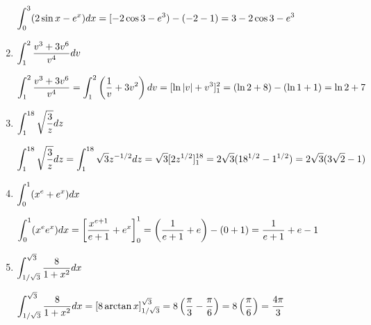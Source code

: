 \begin{enumerate}[1.]
\begin{Solution}
  $\displaystyle \int_0^3 (2 \sin x - e^x) dx = 
    [-2 \cos 3 - e^3) - (-2 - 1) =
    3 - 2 \cos 3 - e^3$
    
\end{Solution}

\item \begin{Question}
    
  $\displaystyle \int_1^2 \frac{v^3 + 3v^6}{v^4} dv$
\end{Question}

\begin{Solution}
  $\displaystyle \int_1^2 \frac{v^3 + 3v^6}{v^4} =
    \int_1^2 \left( \frac{1}{v} + 3v^2 \right) dv =
    [ \ln |v| + v^3]_1^2 = 
    ( \ln 2 + 8 ) - ( \ln 1 + 1) =
    \ln 2 + 7$
\end{Solution}

\item \begin{Question}
    
  $\displaystyle \int_1^{18} \sqrt{\frac{3}{z}} dz$
\end{Question}

\begin{Solution}
  $\displaystyle \int_1^{18} \sqrt{\frac{3}{z}} dz =
    \int_1^{18} \sqrt{3} z^{-1/2} dz =
    \sqrt{3} [ 2z^{1/2} ]_1^{18} =
    2 \sqrt{3} (18^{1/2} - 1^{1/2}) = 
    2 \sqrt{3} (3 \sqrt{2} - 1)$
\end{Solution}

\item \begin{Question}
    
  $\displaystyle \int_0^1 (x^e + e^x) dx$
\end{Question}

\begin{Solution}
    
  $\displaystyle \int_0^1 (x^e e^x) dx = 
    \left[ \frac{x^{e + 1}}{e + 1} + e^x \right]_0^1 =
    \left( \frac{1}{e + 1} + e \right) - (0 + 1) = 
    \frac{1}{e + 1} + e - 1$
\end{Solution}

\item \begin{Question}
    
  $\displaystyle \int_{1 / \sqrt{3}}^{\sqrt{3}} \frac{8}{1 + x^2} dx$
\end{Question}

\begin{Solution}
  $\displaystyle \int_{1 / \sqrt{3}}^{\sqrt{3}} \frac{8}{1 + x^2} dx =
    \left[ 8 \arctan x \right]_{1 / \sqrt{3}}^{\sqrt{3}} =
    8 \left( \frac{\pi}{3} - \frac{\pi}{6} \right) =
    8 \left( \frac{\pi}{6} \right) = \frac{4 \pi}{3}$
    

\end{Solution}
\end{enumerate}
